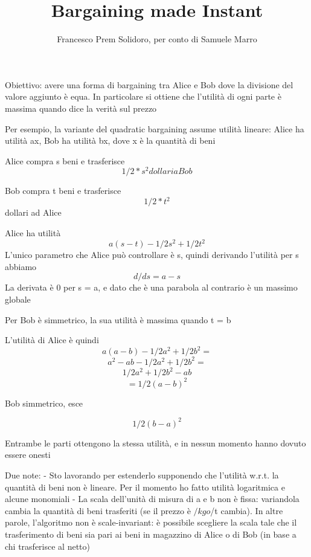 \documentclass{article}
\author{Francesco Prem Solidoro, per conto di Samuele Marro}
\title{Bargaining made Instant}
\begin{document}
\maketitle
Obiettivo: avere una forma di bargaining tra Alice e Bob dove la divisione del valore aggiunto è equa. In particolare si ottiene che l'utilità di ogni parte è massima quando dice la verità sul prezzo

Per esempio, la variante del quadratic bargaining assume utilità lineare: Alice ha utilità ax, Bob ha utilità bx, dove x è la quantità di beni

Alice compra s beni e trasferisce 
$$1/2 * s^2 dollari a Bob$$

Bob compra t beni e trasferisce 
$$1/2 * t^2$$
dollari ad Alice

Alice ha utilità 
$$a(s - t) - 1/2 s^2 + 1/2 t^2$$
L'unico parametro che Alice può controllare è s, quindi derivando l'utilità per s abbiamo
$$d/ds = a - s$$
La derivata è 0 per s = a, e dato che è una parabola al contrario è un massimo globale

Per Bob è simmetrico, la sua utilità è massima quando t = b

L'utilità di Alice è quindi 
$$a(a - b) - 1/2 a^2 + 1/2 b^2 =$$ 
$$a^2 - ab - 1/2 a^2 + 1/2 b^2 =$$
$$1/2 a^2 + 1/2 b^2 - ab$$ 
$$= 1/2 (a - b)^2$$

Bob simmetrico, esce 

$$1/2 (b - a)^2$$

Entrambe le parti ottengono la stessa utilità, e in nessun momento hanno dovuto essere onesti

Due note:
- Sto lavorando per estenderlo supponendo che l'utilità w.r.t. la quantità di beni non è lineare. Per il momento ho fatto utilità logaritmica e alcune monomiali
- La scala dell'unità di misura di a e b non è fissa: variandola cambia la quantità di beni trasferiti (se il prezzo è $/kg o $/t cambia). In altre parole, l'algoritmo non è scale-invariant: è possibile scegliere la scala tale che il trasferimento di beni sia pari ai beni in magazzino di Alice o di Bob (in base a chi trasferisce al netto)
\end{document}
